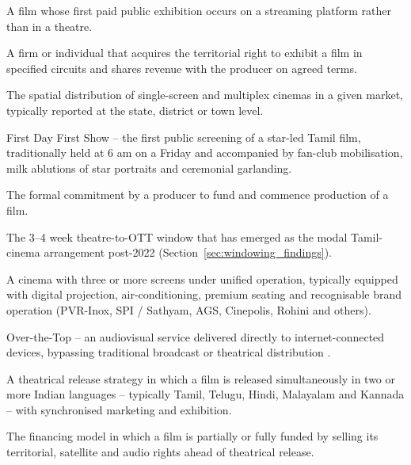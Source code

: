 \begin{description}[style=nextline,leftmargin=2.4em]
\item[Direct-to-OTT.]  A film whose first paid public exhibition
        occurs on a streaming platform rather than in a theatre.

\item[Distributor.]  A firm or individual that acquires the
        territorial right to exhibit a film in specified circuits
        and shares revenue with the producer on agreed terms.

\item[Exhibition geography.]  The spatial distribution of single-screen
        and multiplex cinemas in a given market, typically reported
        at the state, district or town level.

\item[FDFS.]  First Day First Show -- the first public screening of
        a star-led Tamil film, traditionally held at 6 am on a
        Friday and accompanied by fan-club mobilisation, milk
        ablutions of star portraits and ceremonial garlanding.

\item[Greenlight.]  The formal commitment by a producer to fund and
        commence production of a film.

\item[Hybrid window.]  The 3--4 week theatre-to-OTT window that has
        emerged as the modal Tamil-cinema arrangement post-2022
        (Section~\ref{sec:windowing_findings}).

\item[Multiplex.]  A cinema with three or more screens under unified
        operation, typically equipped with digital projection,
        air-conditioning, premium seating and recognisable brand
        operation (PVR-Inox, SPI / Sathyam, AGS, Cinepolis, Rohini
        and others).

\item[OTT.]  Over-the-Top -- an audiovisual service delivered
        directly to internet-connected devices, bypassing
        traditional broadcast or theatrical distribution
        \citep{lobato2019}.

\item[Pan-India release.]  A theatrical release strategy in which a
        film is released simultaneously in two or more Indian
        languages -- typically Tamil, Telugu, Hindi, Malayalam and
        Kannada -- with synchronised marketing and exhibition.

\item[Pre-sale economics.]  The financing model in which a film is
        partially or fully funded by selling its territorial,
        satellite and audio rights ahead of theatrical release.


\end{description}
